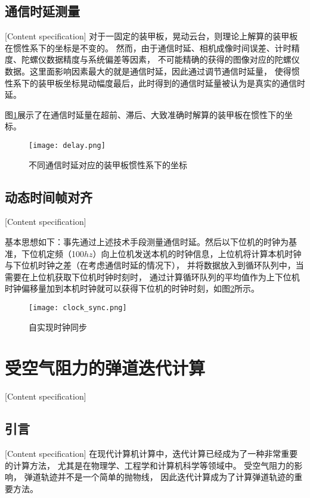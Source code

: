 \subsection{通信时延测量}[Content specification]
对于一固定的装甲板，晃动云台，则理论上解算的装甲板在惯性系下的坐标是不变的。
然而，由于通信时延、相机成像时间误差、计时精度、陀螺仪数据精度与系统偏差等因素，
不可能精确的获得的图像对应的陀螺仪数据。这里面影响因素最大的就是通信时延，因此通过调节通信时延量，
使得惯性系下的装甲板坐标晃动幅度最后，此时得到的通信时延量被认为是真实的通信时延。
\par
图\ref{delay}展示了在通信时延量在超前、滞后、大致准确时解算的装甲板在惯性下的坐标。
\begin{figure}[H]
    \centering
    \texttt{[image: delay.png]} 
    \caption{不同通信时延对应的装甲板惯性系下的坐标} 
    \label{delay}
\end{figure}

\subsection{动态时间帧对齐}[Content specification]

基本思想如下：事先通过上述技术手段测量通信时延。然后以下位机的时钟为基准，下位机定频（100$hz$）向上位机发送本机的时钟信息，上位机将计算本机时钟与下位机时钟之差（在考虑通信时延的情况下），
并将数据放入到循环队列中，当需要在上位机获取下位机时钟时刻时，
通过计算循环队列的平均值作为上下位机时钟偏移量加到本机时钟就可以获得下位机的时钟时刻，如图\ref{clock_sync}所示。

\begin{figure}[H]
    \centering
    \texttt{[image: clock\_sync.png]} 
    \caption{自实现时钟同步} 
    \label{clock_sync}
\end{figure}




\section{受空气阻力的弹道迭代计算}[Content specification]


\subsection{引言}[Content specification]
在现代计算机计算中，迭代计算已经成为了一种非常重要的计算方法，
尤其是在物理学、工程学和计算机科学等领域中。
受空气阻力的影响，
弹道轨迹并不是一个简单的抛物线，
因此迭代计算成为了计算弹道轨迹的重要方法。


